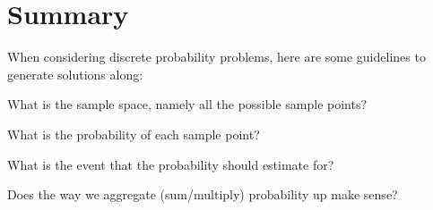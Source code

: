 \section{Summary}
When considering discrete probability problems, here are some guidelines to generate solutions along:
\begin{bindenum}
    \item What is the sample space, namely all the possible sample points?
    \item What is the probability of each sample point?
    \item What is the event that the probability should estimate for?
    \item Does the way we aggregate (sum/multiply) probability up make sense?
\end{bindenum}
